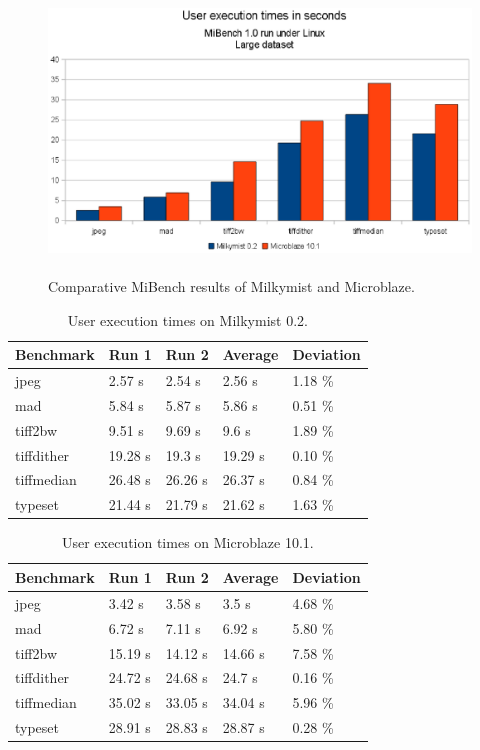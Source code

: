 \documentclass[a4paper,11pt]{kthesis}
\begin{document}
\begin{figure}[htp]
\centering
\includegraphics[height=75mm]{mm_vs_mb.eps}
\caption{Comparative MiBench results of Milkymist and Microblaze.}
\label{fig:mmvsmb}
\end{figure}

\begin{table}
\centering
\begin{tabular}{|l|l|l|l|l|}
\hline
\textbf{Benchmark} & \textbf{Run 1} & \textbf{Run 2} & \textbf{Average} & \textbf{Deviation}  \\
\hline
jpeg & 2.57 s & 2.54 s & 2.56 s & 1.18 \% \\
\hline
mad & 5.84 s & 5.87 s & 5.86 s & 0.51 \% \\
\hline
tiff2bw & 9.51 s & 9.69 s & 9.6 s & 1.89 \% \\
\hline
tiffdither & 19.28 s & 19.3 s & 19.29 s & 0.10 \% \\
\hline
tiffmedian & 26.48 s & 26.26 s & 26.37 s & 0.84 \% \\
\hline
typeset & 21.44 s & 21.79 s & 21.62 s & 1.63 \% \\
\hline
\end{tabular}
\caption{User execution times on Milkymist 0.2.}\label{tab:milkymistspeed}
\end{table}

\begin{table}
\centering
\begin{tabular}{|l|l|l|l|l|}
\hline
\textbf{Benchmark} & \textbf{Run 1} & \textbf{Run 2} & \textbf{Average} & \textbf{Deviation}  \\
\hline
jpeg & 3.42 s & 3.58 s & 3.5 s & 4.68 \% \\
\hline
mad & 6.72 s & 7.11 s & 6.92 s & 5.80 \% \\
\hline
tiff2bw & 15.19 s & 14.12 s & 14.66 s & 7.58 \% \\
\hline
tiffdither & 24.72 s & 24.68 s & 24.7 s & 0.16 \% \\
\hline
tiffmedian & 35.02 s & 33.05 s & 34.04 s & 5.96 \% \\
\hline
typeset & 28.91 s & 28.83 s & 28.87 s & 0.28 \% \\
\hline
\end{tabular}
\caption{User execution times on Microblaze 10.1.}\label{tab:microblazespeed}
\end{table}
\end{document}

